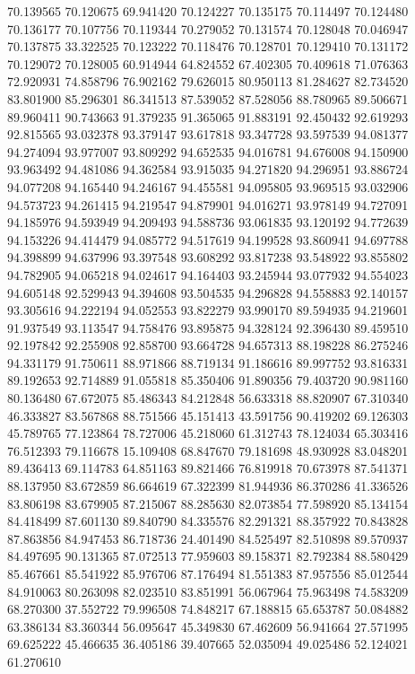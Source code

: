 70.139565
70.120675
69.941420
70.124227
70.135175
70.114497
70.124480
70.136177
70.107756
70.119344
70.279052
70.131574
70.128048
70.046947
70.137875
33.322525
70.123222
70.118476
70.128701
70.129410
70.131172
70.129072
70.128005
60.914944
64.824552
67.402305
70.409618
71.076363
72.920931
74.858796
76.902162
79.626015
80.950113
81.284627
82.734520
83.801900
85.296301
86.341513
87.539052
87.528056
88.780965
89.506671
89.960411
90.743663
91.379235
91.365065
91.883191
92.450432
92.619293
92.815565
93.032378
93.379147
93.617818
93.347728
93.597539
94.081377
94.274094
93.977007
93.809292
94.652535
94.016781
94.676008
94.150900
93.963492
94.481086
94.362584
93.915035
94.271820
94.296951
93.886724
94.077208
94.165440
94.246167
94.455581
94.095805
93.969515
93.032906
94.573723
94.261415
94.219547
94.879901
94.016271
93.978149
94.727091
94.185976
94.593949
94.209493
94.588736
93.061835
93.120192
94.772639
94.153226
94.414479
94.085772
94.517619
94.199528
93.860941
94.697788
94.398899
94.637996
93.397548
93.608292
93.817238
93.548922
93.855802
94.782905
94.065218
94.024617
94.164403
93.245944
93.077932
94.554023
94.605148
92.529943
94.394608
93.504535
94.296828
94.558883
92.140157
93.305616
94.222194
94.052553
93.822279
93.990170
89.594935
94.219601
91.937549
93.113547
94.758476
93.895875
94.328124
92.396430
89.459510
92.197842
92.255908
92.858700
93.664728
94.657313
88.198228
86.275246
94.331179
91.750611
88.971866
88.719134
91.186616
89.997752
93.816331
89.192653
92.714889
91.055818
85.350406
91.890356
79.403720
90.981160
80.136480
67.672075
85.486343
84.212848
56.633318
88.820907
67.310340
46.333827
83.567868
88.751566
45.151413
43.591756
90.419202
69.126303
45.789765
77.123864
78.727006
45.218060
61.312743
78.124034
65.303416
76.512393
79.116678
15.109408
68.847670
79.181698
48.930928
83.048201
89.436413
69.114783
64.851163
89.821466
76.819918
70.673978
87.541371
88.137950
83.672859
86.664619
67.322399
81.944936
86.370286
41.336526
83.806198
83.679905
87.215067
88.285630
82.073854
77.598920
85.134154
84.418499
87.601130
89.840790
84.335576
82.291321
88.357922
70.843828
87.863856
84.947453
86.718736
24.401490
84.525497
82.510898
89.570937
84.497695
90.131365
87.072513
77.959603
89.158371
82.792384
88.580429
85.467661
85.541922
85.976706
87.176494
81.551383
87.957556
85.012544
84.910063
80.263098
82.023510
83.851991
56.067964
75.963498
74.583209
68.270300
37.552722
79.996508
74.848217
67.188815
65.653787
50.084882
63.386134
83.360344
56.095647
45.349830
67.462609
56.941664
27.571995
69.625222
45.466635
36.405186
39.407665
52.035094
49.025486
52.124021
61.270610
